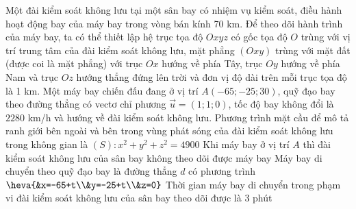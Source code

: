 \begin{ex}%
	Một đài kiểm soát không lưu tại một sân bay có nhiệm vụ kiểm soát, điều hành hoạt động bay của máy bay trong vòng bán kính 70 km. Để theo dõi hành trình của máy bay, ta có thể thiết lập hệ trục tọa độ $Oxyz$ có gốc tọa độ $O$ trùng với vị trí trung tâm của đài kiểm soát không lưu, mặt phẳng $(Oxy)$ trùng với mặt đất (được coi  là mặt phẳng) với trục $Ox$ hướng về phía Tây, trục $Oy$ hướng về phía Nam và trục $Oz$ hướng thẳng đứng lên trời và đơn vị độ dài trên mỗi trục tọa độ là 1 km. Một máy bay chiến đấu đang ở vị trí $A(-65;-25; 30)$, quỹ đạo bay theo đường thẳng có vectơ chỉ phương $\overrightarrow{u}=(1; 1; 0)$, tốc độ bay không đổi là $2280$ km/h và hướng về đài kiểm soát không lưu.
	 \choiceTF
		{\True Phương trình mặt cầu để mô tả ranh giới bên ngoài và bên trong vùng phát sóng của  đài kiểm soát không lưu trong không gian là $(S)\colon x^2+y^2+z^2=4900$}
		{\True Khi máy bay ở vị trí $A$ thì đài kiểm soát không lưu  của sân bay không theo dõi được máy bay}
		{Máy bay di chuyển theo quỹ đạo bay là đường thẳng $d$ có  phương trình $\heva{&x=-65+t\\&y=-25+t\\&z=0}$}
		{Thời gian  máy bay di chuyển trong phạm vi đài kiểm soát không lưu của sân bay theo dõi được là 3 phút}
\end{ex}


